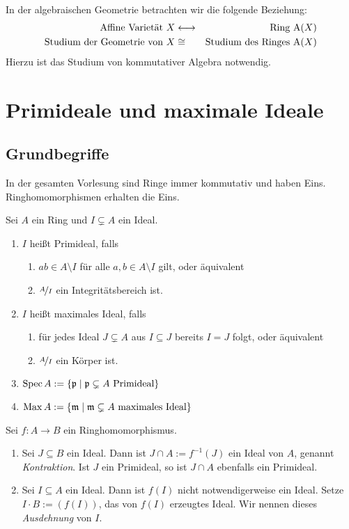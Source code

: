 \documentclass[12pt,a4paper]{scrartcl}
\theoremstyle{cplain}
\theoremstyle{cdef}
\begin{document}
In der algebraischen Geometrie betrachten wir die folgende Beziehung:
\begin{eqnarray*}
    \text{Affine Varietät $X$} & \longleftrightarrow & \text{Ring $\operatorname{A}(X)$} \\
    \text{Studium der Geometrie von $X$} & \cong & \text{Studium des Ringes $\operatorname{A}(X)$}
\end{eqnarray*}
Hierzu ist das Studium von kommutativer Algebra notwendig.
\newpage

\section{Primideale und maximale Ideale}
\subsection{Grundbegriffe}
\begin{konv}
	In der gesamten Vorlesung sind Ringe immer kommutativ und haben Eins. Ringhomomorphismen erhalten die Eins.
\end{konv}
\begin{defi}
	Sei $A$ ein Ring und $I\subsetneq A$ ein Ideal.
	\begin{enumerate}
        \item $I$ heißt Primideal, falls \begin{enumerate}
            \item $ab \in A \setminus I$ für alle $a,b \in A \setminus I$ gilt, oder äquivalent
            \item $\nicefrac{A}{I}$ ein Integritätsbereich ist.
        \end{enumerate}
        \item $I$ heißt maximales Ideal, falls \begin{enumerate}
            \item für jedes Ideal $J \subsetneq A$ aus $I \subseteq J$ bereits $I=J$ folgt, oder äquivalent
            \item $\nicefrac{A}{I}$ ein Körper ist.
        \end{enumerate}
		\item $\operatorname{Spec} A := \{\mathfrak{p} \mid \mathfrak{p} \subsetneq A \text{ Primideal}\}$
		\item $\operatorname{Max} A:=\{\mathfrak{m} \mid \mathfrak{m} \subsetneq A \text{ maximales Ideal}\}$
	\end{enumerate}
\end{defi}
\begin{defi} Sei $f: A \to B$ ein Ringhomomorphismus.
	\begin{enumerate}
		\item Sei $J \subseteq B$ ein Ideal. Dann ist $J \cap A:=f^{-1}(J)$ ein Ideal von $A$, genannt \emph{Kontraktion}. Ist $J$ ein Primideal, so ist $J \cap A$ ebenfalls ein Primideal.
		\item Sei $I \subseteq A$ ein Ideal. Dann ist $f(I)$ nicht notwendigerweise ein Ideal. Setze $I \cdot B := \left( f(I) \right)$, das von $f(I)$ erzeugtes Ideal. Wir nennen dieses \emph{Ausdehnung} von $I$.
	\end{enumerate}
\end{defi}
\end{document}
